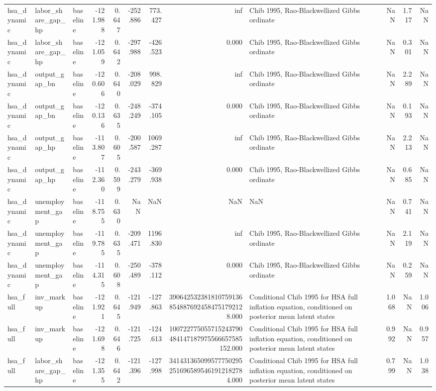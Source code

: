 \begin{tabular}{lllrrrrrlrrr}
hsa\_dynamic & labor\_share\_gap\_hp & baseline & -121.988 & 0.647 & -252.886 & 773.427 & inf & Chib 1995, Rao-Blackwellized Gibbs ordinate & NaN & 1.717 & NaN \\
hsa\_dynamic & labor\_share\_gap\_hp & baseline & -121.059 & 0.642 & -297.988 & -426.523 & 0.000 & Chib 1995, Rao-Blackwellized Gibbs ordinate & NaN & 0.301 & NaN \\
hsa\_dynamic & output\_gap\_bn & baseline & -120.606 & 0.640 & -208.029 & 998.829 & inf & Chib 1995, Rao-Blackwellized Gibbs ordinate & NaN & 2.289 & NaN \\
hsa\_dynamic & output\_gap\_bn & baseline & -120.136 & 0.635 & -248.249 & -374.105 & 0.000 & Chib 1995, Rao-Blackwellized Gibbs ordinate & NaN & 0.193 & NaN \\
hsa\_dynamic & output\_gap\_hp & baseline & -113.807 & 0.605 & -200.587 & 1069.287 & inf & Chib 1995, Rao-Blackwellized Gibbs ordinate & NaN & 2.213 & NaN \\
hsa\_dynamic & output\_gap\_hp & baseline & -112.360 & 0.599 & -243.279 & -369.938 & 0.000 & Chib 1995, Rao-Blackwellized Gibbs ordinate & NaN & 0.685 & NaN \\
hsa\_dynamic & unemployment\_gap & baseline & -118.755 & 0.630 & NaN & NaN & NaN & NaN & NaN & 0.741 & NaN \\
hsa\_dynamic & unemployment\_gap & baseline & -119.785 & 0.635 & -209.471 & 1196.830 & inf & Chib 1995, Rao-Blackwellized Gibbs ordinate & NaN & 2.119 & NaN \\
hsa\_dynamic & unemployment\_gap & baseline & -114.315 & 0.608 & -250.489 & -378.112 & 0.000 & Chib 1995, Rao-Blackwellized Gibbs ordinate & NaN & 0.259 & NaN \\
hsa\_full & inv\_markup & baseline & -121.921 & 0.645 & -121.949 & -127.863 & 3906425323818107591368548876924584751792128.000 & Conditional Chib 1995 for HSA full inflation equation, conditioned on posterior mean latent states & 1.068 & NaN & 1.006 \\
hsa\_full & inv\_markup & baseline & -121.698 & 0.646 & -121.725 & -124.613 & 100722775055715243790484147187975566657585152.000 & Conditional Chib 1995 for HSA full inflation equation, conditioned on posterior mean latent states & 0.992 & NaN & 0.957 \\
hsa\_full & labor\_share\_gap\_hp & baseline & -121.355 & 0.642 & -121.396 & -127.998 & 3414313650995777502952516965895461912182784.000 & Conditional Chib 1995 for HSA full inflation equation, conditioned on posterior mean latent states & 0.799 & NaN & 1.038 \\

\end{tabular}
